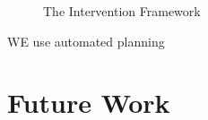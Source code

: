 \begin{figure}[tpb]
   \caption{The Intervention Framework}
\label{fig:summary}
\end{figure}

WE use automated planning


\section{Future Work}